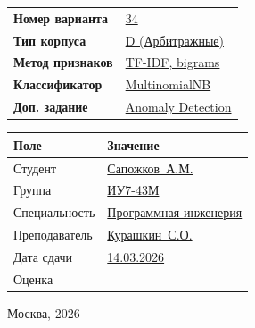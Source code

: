 \documentclass[12pt, a4paper]{report}
\begin{document}
\begin{titlepage}
\begin{center}
  \begin{tcolorbox}[colback=LightBlue!50, colframe=SteelBlue,
    fonttitle=\sffamily\small\bfseries\color{NavyBlue}, boxrule=1pt,
    left=8pt, right=8pt, top=6pt, bottom=6pt, title={Параметры варианта}]
    \begin{tabular}{p{5cm}p{7cm}}
      {\sffamily\small\bfseries Номер варианта}   & \underline{34\hspace{5cm}} \\[4pt]
      {\sffamily\small\bfseries Тип корпуса}      & \underline{D (Арбитражные)\hspace{2cm}} \\[4pt]
      {\sffamily\small\bfseries Метод признаков}  & \underline{TF-IDF, bigrams\hspace{2.2cm}} \\[4pt]
      {\sffamily\small\bfseries Классификатор}    & \underline{MultinomialNB\hspace{2.5cm}} \\[4pt]
      {\sffamily\small\bfseries Доп. задание}     & \underline{Anomaly Detection\hspace{1.5cm}} \\
    \end{tabular}
  \end{tcolorbox}

  \vspace{14pt}

\end{center}

\begin{flushright}
\begin{tabular}{p{5cm}p{7cm}}
	\toprule
	\rowcolor{LightBlue}
	\sffamily\small\bfseries Поле & \sffamily\small\bfseries Значение \\
	\midrule
	\sffamily\small Студент       & \underline{Сапожков~А.М.\hspace{3.5cm}} \\[4pt]
	\sffamily\small Группа        & \underline{ИУ7-43М\hspace{4.5cm}} \\[4pt]
	\sffamily\small Специальность & \underline{Программная инженерия\hspace{1.5cm}} \\[4pt]
	\sffamily\small Преподаватель & \underline{Курашкин~С.О.\hspace{3.5cm}} \\[4pt]
	\sffamily\small Дата сдачи    & \underline{14.03.2026\hspace{4.5cm}} \\[4pt]
	\sffamily\small Оценка        & \underline{\hspace{6.5cm}} \\
	\bottomrule
\end{tabular}
\end{flushright}

\vfill
\begin{center}
  {\sffamily\normalsize Москва, 2026}
\end{center}
\end{titlepage}
\end{document}
